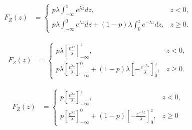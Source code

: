 \documentclass[answers]{exam}
\begin{document}
\begin{questions}
\begin{parts}
\begin{solution}
            \begin{align*}
                F_Z(z) & = \begin{cases}
                               p \lambda \int_{-\infty}^{z} e^{\lambda z} dz,                                                  & z < 0,   \\
                               p \lambda \int_{-\infty}^{0} e^{\lambda z} dz + (1 - p) \lambda \int_{0}^{z} e^{-\lambda z} dz, & z \ge 0.
                           \end{cases}
            \end{align*}

            \begin{align*}
                F_Z(z) & = \begin{cases}
                               p \lambda \left[\frac{e^{\lambda z}}{\lambda}\right]_{-\infty}^{z},                                                                        & z < 0,   \\
                               p \lambda \left[\frac{e^{\lambda z}}{\lambda}\right]_{-\infty}^{0} + (1 - p) \lambda \left[-\frac{e^{-\lambda z}}{\lambda}\right]_{0}^{z}, & z \ge 0.
                           \end{cases}
            \end{align*}

            \begin{align*}
                F_Z(z) & = \begin{cases}
                               p \left[\frac{e^{\lambda z}}{\lambda}\right]_{-\infty}^{z},                                                                & z < 0,  \\
                               p \left[\frac{e^{\lambda z}}{\lambda}\right]_{-\infty}^{0} + (1 - p) \left[-\frac{e^{-\lambda z}}{\lambda}\right]_{0}^{z}, & z \ge 0
                           \end{cases}
            \end{align*}
        \end{solution}
    \end{parts}
\end{questions}
\end{document}
